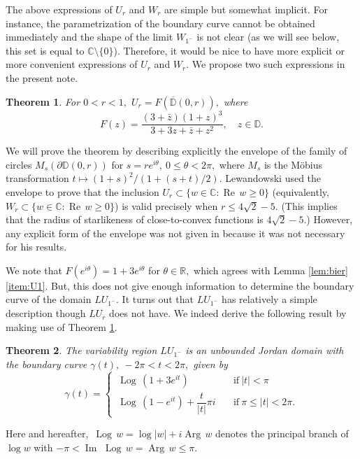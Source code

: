 \documentclass[a4paper,12pt]{amsart}
\numberwithin{equation}{section}
\newtheorem{thm}{Theorem}[section]
\theoremstyle{definition}
\begin{document}
The above expressions of $U_r$ and $W_r$ are simple but somewhat implicit.
For instance, the parametrization of the boundary curve cannot be obtained immediately
and the shape of the limit $W_{1^-}$ is not clear (as we will see below,
this set is equal to ${{\mathbb C}}\setminus\{0\}$).
Therefore, it would be nice to have more explicit or more convenient expressions
of $U_r$ and $W_r$.
We propose two such expressions in the present note.

\begin{thm}\label{thm:F}
For $0<r<1,$ $U_r=F({{\overline{\mathbb D}}}(0,r)),$ where
$$
F(z)=\frac{(3+\bar z)(1+z)^3}{3+3z+\bar z+z^2},
\quad z\in{{\mathbb D}}.
$$
\end{thm}

We will prove the theorem by describing explicitly the envelope of the family
of circles $M_s(\partial{{\mathbb D}}(0,r))$ for $s=re^{i\theta},~0\le\theta<2\pi,$
where $M_s$ is the M\"obius transformation $t\mapsto (1+s)^2/(1+(s+t)/2).$
Lewandowski \cite[p.~45]{lew60} used the envelope to prove that
the inclusion $U_r\subset\{w\in{{\mathbb C}}: {{\operatorname{Re}\,}} w\ge0\}$ (equivalently,
$W_r\subset\{w\in{{\mathbb C}}: {{\operatorname{Re}\,}} w\ge0\}$) is valid
precisely when $r\le 4\sqrt2-5.$
(This implies that the radius of starlikeness of close-to-convex functions
is $4\sqrt2-5.$)
However, any explicit form of the envelope was not given in \cite{lew60}
because it was not necessary for his results.

We note that $F(e^{i\theta})=1+3e^{i\theta}$ for $\theta\in{{\mathbb R}},$
which agrees with Lemma \ref{lem:bier} \eqref{item:U1}.
But, this does not give enough information to determine the boundary
curve of the domain $LU_{1^-}.$
It turns out that $LU_{1^-}$ has relatively a simple description
though $LU_r$ does not have.
We indeed derive the following result by making use of Theorem \ref{thm:F}.

\begin{thm}\label{thm:LU1}
The variability region $LU_{1^-}$ is an unbounded Jordan domain
with the boundary curve $\gamma(t),~-2\pi<t<2\pi,$ given by
$$
\gamma(t)=
\begin{cases}
{{\,\operatorname{Log}\,}}(1+3e^{it}) & \quad\text{if}~ |t|< \pi \\
{{\,\operatorname{Log}\,}}(1-e^{it})+\dfrac{t}{|t|}\pi i & \quad\text{if}~ \pi\le|t|<2\pi.
\end{cases}
$$
\end{thm}

Here and hereafter,
${{\,\operatorname{Log}\,}} w=\log|w|+i{{\operatorname{Arg}\,}} w$ denotes the principal branch of $\log w$ with
$-\pi<{{\operatorname{Im}\,}}{{\,\operatorname{Log}\,}} w={{\operatorname{Arg}\,}} w\le\pi.$
\end{document}
